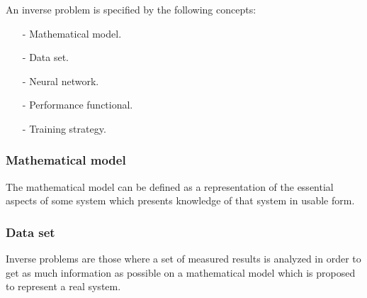 An inverse problem is specified by the following concepts:

\begin{itemize}
\item[-] Mathematical model.
\item[-] Data set.
\item[-] Neural network.
\item[-] Performance functional.
\item[-] Training strategy.
\end{itemize}

\subsubsection*{Mathematical model}

The mathematical model can be defined as a representation of the
essential aspects of some system which presents knowledge of that
system in usable form.







\subsubsection*{Data set}

Inverse problems are those where a set of measured results is
analyzed in order to get as much information as possible on a
mathematical model which is proposed to represent a real system.

